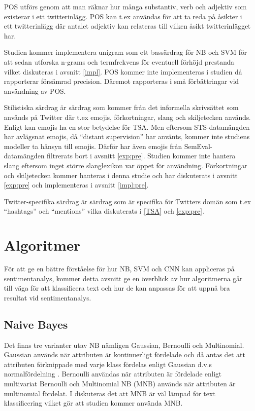 \documentclass{kaumasters} %
\begin{document}
POS utförs genom att man räknar hur många substantiv, verb och adjektiv som existerar i ett twitterinlägg. POS kan t.ex användas för att ta reda på åsikter i ett twitterinlägg där antalet adjektiv kan relateras till vilken åsikt twitterinlägget har.

Studien kommer implementera unigram som ett bassärdrag för NB och SVM för att sedan utforska n-grams och termfrekvens för eventuell förhöjd prestanda vilket diskuteras i avsnitt \ref{impl}. POS kommer inte implementeras i studien då \cite{go2009twitter, feature:001} rapporterar försämrad precision. Däremot rapporteras i \cite{feature:002} små förbättringar vid användning av POS.

Stilistiska särdrag är särdrag som kommer från det informella skrivsättet som används på Twitter där t.ex emojis, förkortningar, slang och skiljetecken används. Enligt \cite{feature:002} kan emojis ha en stor betydelse för TSA. Men eftersom STS-datamängden har avlägsnat emojis, då “distant supervision” \cite{sts:001} har använts, kommer inte studiens modeller ta hänsyn till emojis. Därför har även emojis från SemEval-datamängden filtrerats bort i avsnitt \ref{exp:pre}. Studien kommer inte hantera slang eftersom inget större slanglexikon var öppet för användning. 
Förkortningar och skiljetecken kommer hanteras i denna studie och har diskuterats i avsnitt \ref{exp:pre} och implementeras i avsnitt \ref{impl:pre}.

Twitter-specifika särdrag är särdrag som är specifika för Twitters domän som t.ex “hashtags” och “mentions” vilka diskuterats i \ref{TSA} och \ref{exp:pre}.




\section{Algoritmer}
För att ge en bättre förståelse för hur NB, SVM och CNN kan appliceras på sentimentanalys, kommer detta avsnitt ge en överblick av hur algoritmerna går till väga för att klassificera text och hur de kan anpassas för att uppnå bra resultat vid sentimentanalys.

\subsection{Naive Bayes}
Det finns tre varianter utav NB nämligen Gaussian, Bernoulli och Multinomial. Gaussian används när attributen är kontinuerligt fördelade och då antas det att attributen förknippade med varje klass fördelas enligt Gaussian d.v.s normalfördelning \cite{nb:002}. Bernoulli användas när attributen är fördelade enligt multivariat Bernoulli \cite{nb:004} och Multinomial NB (MNB) används när attributen är multinomial fördelat. I \cite{nb:003} diskuteras det att MNB är väl lämpad för text klassificering vilket gör att studien kommer använda MNB.
\end{document}
